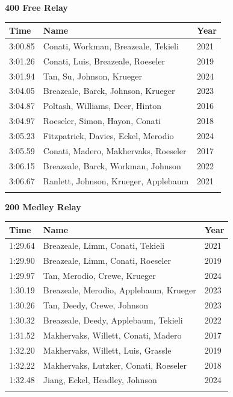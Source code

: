 \vspace{1.2em}
\noindent\begin{minipage}[t]{0.98\textwidth}
\centering
\textbf{\textcolor{teamprimary}{400 Free Relay}}\par
\vspace{0.5em}
\centering
\small
\renewcommand{\arraystretch}{1.0}
\setlength{\tabcolsep}{4pt}
\begin{tabular}{@{}p{4.5cm}p{8.5cm}p{2.5cm}@{}}
\toprule
\textbf{Time} & \textbf{Name} & \textbf{Year} \\
\midrule
3:00.85 & Conati, Workman, Breazeale, Tekieli & 2021 \\
3:01.26 & Conati, Luis, Breazeale, Roeseler & 2019 \\
3:01.94 & Tan, Su, Johnson, Krueger & 2024 \\
3:04.05 & Breazeale, Barck, Johnson, Krueger & 2023 \\
3:04.87 & Poltash, Williams, Deer, Hinton & 2016 \\
3:04.97 & Roeseler, Simon, Hayon, Conati & 2018 \\
3:05.23 & Fitzpatrick, Davies, Eckel, Merodio & 2024 \\
3:05.59 & Conati, Madero, Makhervaks, Roeseler & 2017 \\
3:06.15 & Breazeale, Barck, Workman, Johnson & 2022 \\
3:06.67 & Ranlett, Johnson, Krueger, Applebaum & 2021 \\
\bottomrule
\vspace{0.5em}
\end{tabular}
\end{minipage}
\vspace{1.2em}
\noindent\begin{minipage}[t]{0.98\textwidth}
\centering
\textbf{\textcolor{teamprimary}{200 Medley Relay}}\par
\vspace{0.5em}
\centering
\small
\renewcommand{\arraystretch}{1.0}
\setlength{\tabcolsep}{4pt}
\begin{tabular}{@{}p{4.5cm}p{8.5cm}p{2.5cm}@{}}
\toprule
\textbf{Time} & \textbf{Name} & \textbf{Year} \\
\midrule
1:29.64 & Breazeale, Limm, Conati, Tekieli & 2021 \\
1:29.90 & Breazeale, Limm, Conati, Roeseler & 2019 \\
1:29.97 & Tan, Merodio, Crewe, Krueger & 2024 \\
1:30.19 & Breazeale, Merodio, Applebaum, Krueger & 2023 \\
1:30.26 & Tan, Deedy, Crewe, Johnson & 2023 \\
1:30.32 & Breazeale, Deedy, Applebaum, Tekieli & 2022 \\
1:31.52 & Makhervaks, Willett, Conati, Madero & 2017 \\
1:32.20 & Makhervaks, Willett, Luis, Grassle & 2019 \\
1:32.22 & Makhervaks, Lutzker, Conati, Roeseler & 2018 \\
1:32.48 & Jiang, Eckel, Headley, Johnson & 2024 \\
\bottomrule
\vspace{0.5em}
\end{tabular}
\end{minipage}

